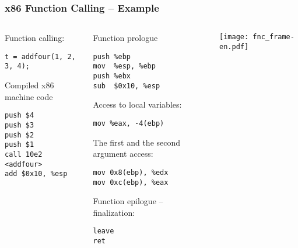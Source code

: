 \documentclass{beamer}
\begin{document}
\begin{frame}[fragile]
\frametitle{x86 Function Calling -- Example}

\begin{columns}
\begin{column}{0.35\textwidth}
Function calling:

\begin{verbatim}
t = addfour(1, 2, 3, 4);
\end{verbatim}

Compiled x86 machine code
\begin{verbatim}
push $4
push $3
push $2
push $1
call 10e2 <addfour>
add $0x10, %esp
\end{verbatim}
\end{column}


\begin{column}{0.35\textwidth}  
Function prologue
\begin{verbatim}
push %ebp
mov  %esp, %ebp
push %ebx
sub  $0x10, %esp
\end{verbatim}

Access to local variables:
\begin{verbatim}
mov %eax, -4(ebp)
\end{verbatim}

The first and the second argument access:
\begin{verbatim}
mov 0x8(ebp), %edx
mov 0xc(ebp), %eax
\end{verbatim}

Function epilogue -- finalization:
\begin{verbatim}
leave
ret
\end{verbatim}
\end{column}

\begin{column}{0.3\textwidth}  
\texttt{[image: fnc\_frame-en.pdf]}
\end{column}

\end{columns}
\end{frame}
\end{document}
